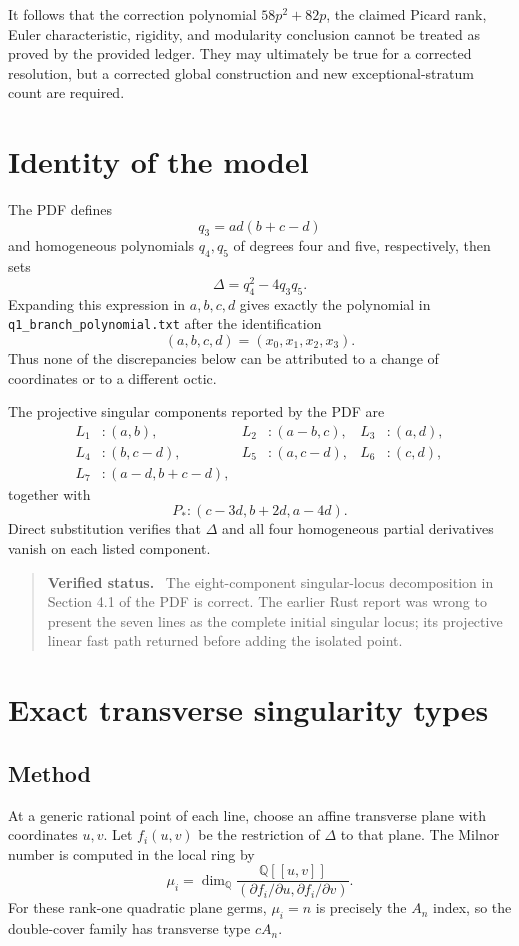 \documentclass[11pt]{article}
\newenvironment{statusnote}
  {\begin{quote}\color{blue!55!black}\textbf{Verified status.}\ }
  {\end{quote}}
\begin{document}
It follows that the correction polynomial $58p^2+82p$, the claimed Picard rank, Euler
characteristic, rigidity, and modularity conclusion cannot be treated as proved by the
provided ledger.  They may ultimately be true for a corrected resolution, but a corrected
global construction and new exceptional-stratum count are required.

\section{Identity of the model}

The PDF defines
\[
q_3=ad(b+c-d)
\]
and homogeneous polynomials $q_4,q_5$ of degrees four and five, respectively, then sets
\[
  \Delta=q_4^2-4q_3q_5.
\]
Expanding this expression in $a,b,c,d$ gives exactly the polynomial in
\texttt{q1\_branch\_polynomial.txt} after the identification
\[
  (a,b,c,d)=(x_0,x_1,x_2,x_3).
\]
Thus none of the discrepancies below can be attributed to a change of coordinates or to a
different octic.

The projective singular components reported by the PDF are
\begin{align*}
L_1&:(a,b), & L_2&:(a-b,c), & L_3&:(a,d),\\
L_4&:(b,c-d), & L_5&:(a,c-d), & L_6&:(c,d),\\
L_7&:(a-d,b+c-d),
\end{align*}
together with
\[
  P_*:(c-3d,b+2d,a-4d).
\]
Direct substitution verifies that $\Delta$ and all four homogeneous partial derivatives
vanish on each listed component.

\begin{statusnote}
The eight-component singular-locus decomposition in Section 4.1 of the PDF is correct.
The earlier Rust report was wrong to present the seven lines as the complete initial
singular locus; its projective linear fast path returned before adding the isolated point.
\end{statusnote}

\section{Exact transverse singularity types}

\subsection{Method}

At a generic rational point of each line, choose an affine transverse plane with coordinates
$u,v$.  Let $f_i(u,v)$ be the restriction of $\Delta$ to that plane.  The Milnor number is
computed in the local ring by
\[
  \mu_i=\dim_{\mathbb Q}\frac{\mathbb Q[[u,v]]}
  {(\partial f_i/\partial u,\partial f_i/\partial v)}.
\]
For these rank-one quadratic plane germs, $\mu_i=n$ is precisely the $A_n$ index, so the
double-cover family has transverse type $cA_n$.
\end{document}
